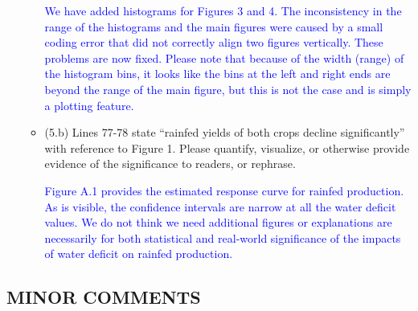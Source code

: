 \documentclass[
]{article}
\begin{document}
\begin{itemize}
\begin{itemize}
   \textcolor{blue}{We have added histograms for Figures 3 and 4. The inconsistency in the range of the histograms and the main figures were caused by a small coding error that did not correctly align two figures vertically. These problems are now fixed. Please note that because of the width (range) of the histogram bins, it looks like the bins at the left and right ends are beyond the range of the main figure, but this is not the case and is simply a plotting feature.}

  \item (5.b) Lines 77-78 state ``rainfed yields of both crops decline significantly'' with reference to Figure 1. Please quantify, visualize, or otherwise provide evidence of the significance to readers, or rephrase.

  \textcolor{blue}{Figure A.1 provides the estimated response curve for rainfed production. As is visible, the confidence intervals are narrow at all the water deficit values. We do not think we need additional figures or explanations are necessarily for both statistical and real-world significance of the impacts of water deficit on rainfed production.}

  \end{itemize}

\end{itemize}

\subsection{MINOR COMMENTS}
\end{document}
